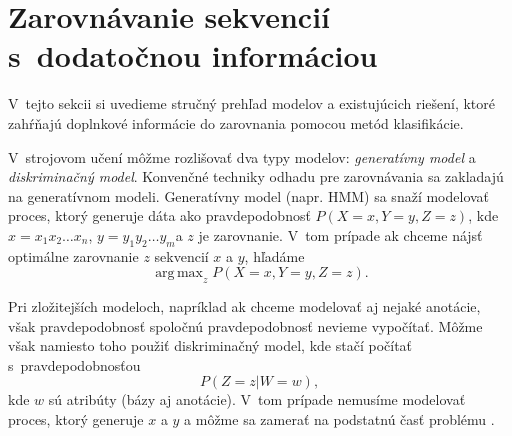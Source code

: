 \section[Zarov. s~dodat. info.]{Zarovnávanie sekvencií s~dodatočnou informáciou}
\label{section:other-work}

V~tejto sekcii si uvedieme stručný prehľad modelov a existujúcich riešení, ktoré zahŕňajú doplnkové informácie do zarovnania pomocou metód klasifikácie.

V~strojovom učení môžme rozlišovať dva typy modelov: \textit{generatívny model} a \textit{diskriminačný model}.
Konvenčné techniky odhadu pre zarovnávania sa zakladajú na generatívnom modeli. Generatívny model (napr. HMM) sa snaží modelovať proces, ktorý generuje dáta ako pravdepodobnosť $P(X=x,Y=y,Z=z)$, kde $x = x_1x_2\dots x_n$, $y = y_1y_2\dots y_m$a $z$ je zarovnanie. V~tom prípade ak chceme nájsť optimálne zarovnanie $z$ sekvencií $x$ a $y$, hľadáme
$$\operatorname{ arg\,max}_z P(X = x,Y = y,Z = z).$$

Pri zložitejších modeloch, napríklad ak chceme modelovať aj nejaké anotácie, však pravdepodobnosť spoločnú pravdepodobnosť nevieme vypočítať.
Môžme však namiesto toho použiť diskriminačný model, kde stačí počítať s~pravdepodobnosťou
$$P(Z=z|W=w),$$ kde $w$ sú atribúty (bázy aj anotácie). V~tom prípade nemusíme modelovať proces, ktorý generuje $x$ a $y$ a môžme sa zamerať na podstatnú časť problému \cite{svmTrainingProteinsAlignment}.



